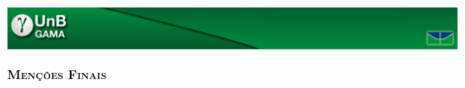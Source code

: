 \documentclass[12pt]{article}
\begin{document}
\begin{center}
    \includegraphics[width=\textwidth]{.latex/logo_fga.pdf}
\end{center}



\begin{huge}\begin{center}
	\textbf{\textsc{Menções Finais}}
\end{center}\end{huge}



\end{document}
